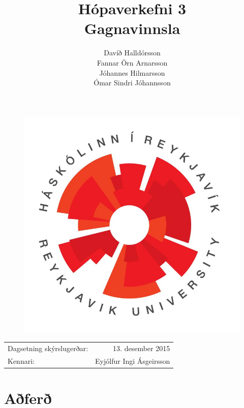 \documentclass[12pt,a4paper]{article}
\begin{document}


\title{Hópaverkefni 3 \\ Gagnavinnsla}
\begin{figure}
\centering
\includegraphics[scale=0.35]{ru}
\end{figure}
\author{Davíð Halldórsson \\ Fannar Örn Arnarsson \\ Jóhannes Hilmarsson \\ Ómar Sindri Jóhannsson}
\date{}
\maketitle

\begin{center}
\begin{tabular}{l r}
Dagsetning skýrslugerðar: &  13. desember 2015\\
Kennari: & Eyjólfur Ingi Ásgeirsson  \\ 
\end{tabular}
\end{center}

\newpage
{} 

\setlength\parindent{0pt} %


\section{Aðferð}
\end{document}
